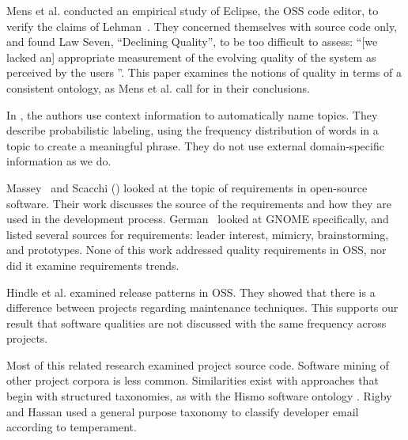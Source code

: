 \documentclass[10pt, conference, compsocconf]{IEEEtran}
\begin{document}

Mens et al. \cite{mens08icsm} conducted an empirical study of Eclipse, the OSS code editor, to verify the claims of Lehman~\cite{lehman97sms}. They concerned themselves with source code only, and found Law Seven, ``Declining Quality'', to be too difficult to assess: ``[we lacked an] appropriate measurement of the evolving quality of the system as perceived by the users \cite[p. 388]{mens08icsm}''. This paper examines the notions of quality in terms of a consistent ontology, as Mens et al. call for in their conclusions.

In \cite{Mei2007}, the authors use context information to automatically name topics. They describe probabilistic labeling, using the frequency distribution of words in a topic to create a meaningful phrase. They do not use external domain-specific information as we do.

Massey~\cite{massey02icse} and Scacchi (\cite{scacchi02,scacchi05b}) looked at the topic of requirements in open-source software. Their work discusses the source of the requirements and how they are used in the development process. German~\cite{german03gnome} looked at GNOME specifically, and listed several sources for requirements: leader interest, mimicry, brainstorming, and prototypes. None of this work  addressed quality requirements in OSS, nor did it examine requirements trends.

Hindle et al. \cite{Hindle2007} examined release patterns in OSS. They showed that there is a difference between projects regarding maintenance techniques. This supports our result that software qualities are not discussed with the same frequency across projects.

Most of this related research examined project source code. Software mining of other project corpora is less common. Similarities exist with approaches that begin with structured taxonomies, as with the Hismo software ontology \cite{girba06}. Rigby and Hassan \cite{rigby07msr} used a general purpose taxonomy to classify developer email according to temperament.
\end{document}
